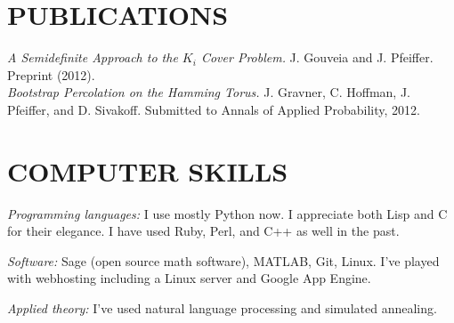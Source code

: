 \documentclass{res}
\begin{document}
\begin{resume}
\section{PUBLICATIONS}
{\em A Semidefinite Approach to the $K_i$ Cover Problem.} J. Gouveia and J. Pfeiffer. Preprint (2012).\\
{\em Bootstrap Percolation on the Hamming Torus.} J. Gravner, C. Hoffman, J. Pfeiffer, and D. Sivakoff. Submitted to Annals of Applied Probability, 2012.


\section{COMPUTER SKILLS}          
    {\em Programming languages:} I use mostly Python now. I appreciate both Lisp and C for their elegance. I have used Ruby, Perl, and C++ as well in the past.

    {\em Software:} Sage (open source math software), MATLAB, Git, Linux. I've played with webhosting including a Linux server and Google App Engine. 

    {\em Applied theory:} I've used natural language processing and simulated annealing.


 
 
  
 
\end{resume}
\end{document}
